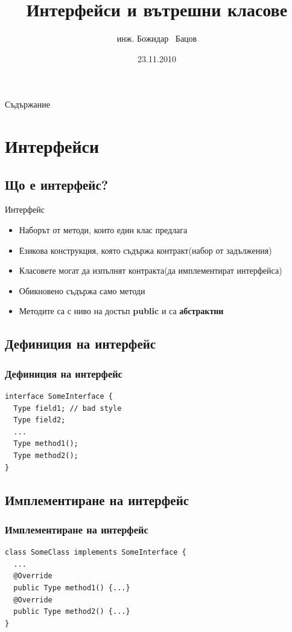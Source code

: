 \documentclass{beamer}
\title{Интерфейси и вътрешни класове}
\author{инж. Божидар ~Бацов}
\institute{Drow Ltd.}
\date{23.11.2010}
\begin{document}
\begin{frame}
  \titlepage
\end{frame}

\begin{frame}{Съдържание}
  \transdissolve
  \tableofcontents[pausesections]
\end{frame}

\section{Интерфейси}

\subsection{Що е интерфейс?}
\begin{frame}{Интерфейс}
  \transdissolve
  \begin{itemize}
  \item
    Наборът от методи, които един клас предлага \pause
  \item
    Езикова конструкция, която съдържа контракт(набор
    от задължения) \pause
  \item Класовете могат да изпълнят контракта(да имплементират
    интерфейса) \pause
  \item Обикновено съдържа само методи \pause
  \item Методите са с ниво на достъп \textbf{public} и са \textbf{абстрактни}
  \end{itemize}
\end{frame}

\subsection{Дефиниция на интерфейс}
\begin{frame}[fragile]
  \frametitle{Дефиниция на интерфейс}
  \transdissolve
\begin{lstlisting}
interface SomeInterface {
  Type field1; // bad style
  Type field2;
  ...
  Type method1();
  Type method2();
}
\end{lstlisting}
\end{frame}

\subsection{Имплементиране на интерфейс}
\begin{frame}[fragile]
  \frametitle{Имплементиране на интерфейс}
  \transdissolve
\begin{lstlisting}
class SomeClass implements SomeInterface {
  ...  
  @Override
  public Type method1() {...}
  @Override
  public Type method2() {...}
}
\end{lstlisting}
\end{frame}
\end{document}
